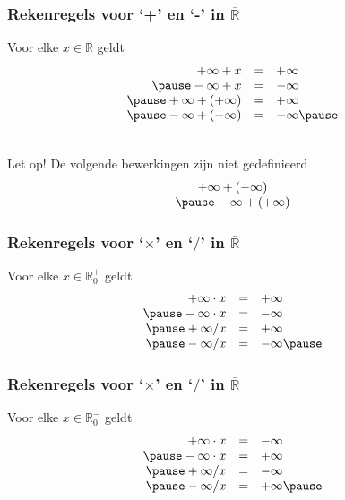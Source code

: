 \begin{frame}
\frametitle{Rekenregels voor `+' en `-' in $\overline{\mathbb{R}}$}
\pause
\begin{eigenschap}
Voor elke $x \in \mathbb{R}$ geldt \pause
\[\begin{array}{rcl}
  +\infty + x & = & +\infty\\ \pause
  -\infty + x & = & -\infty\\ \pause
  +\infty + (+\infty) & = & +\infty\\ \pause
  -\infty + (-\infty) & = & -\infty \pause
  \end{array} \]
\end{eigenschap}
~\\
\pause
Let op! De volgende bewerkingen zijn niet gedefinieerd
\pause
\[\begin{array}{c}
  +\infty + (-\infty) \\ \pause
  -\infty + (+\infty) 
  \end{array} \]
\end{frame}

\begin{frame}
\frametitle{Rekenregels voor `$\times$' en `$/$' in $\overline{\mathbb{R}}$}
\pause
\begin{eigenschap}
Voor elke $x \in \mathbb{R}_0^+$ geldt \pause
\[\begin{array}{rcl}
  +\infty \cdot  x & = & +\infty\\ \pause
  -\infty \cdot  x & = & -\infty\\ \pause
  +\infty / x & = & +\infty\\ \pause
  -\infty / x & = & -\infty   \pause
  \end{array} \]
\end{eigenschap}
\end{frame}

\begin{frame}
\frametitle{Rekenregels voor `$\times$' en `$/$' in $\overline{\mathbb{R}}$}
\begin{eigenschap}
Voor elke $x \in \mathbb{R}_0^-$ geldt \pause
\[\begin{array}{rcl}
  +\infty \cdot  x & = & -\infty\\ \pause
  -\infty \cdot  x & = & +\infty\\ \pause
  +\infty / x & = & -\infty\\ \pause
  -\infty / x & = & +\infty  \pause
  \end{array} \] 
\end{eigenschap}
\end{frame}

